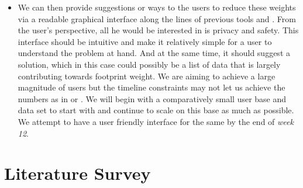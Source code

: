 \documentclass[11pt]{article}
\begin{document}
\begin{itemize}
   \item We can then provide suggestions or ways to the users to reduce these weights via a readable graphical interface along the lines of previous tools \cite{privaware} and \cite{privometer}. From the user’s perspective, all he would be interested in is privacy and safety. This interface should be intuitive and make it relatively simple for a user to understand the problem at hand. And at the same time, it should suggest a solution, which in this case could possibly be a list of data that is largely contributing towards footprint weight. We are aiming to achieve a large magnitude of users but the timeline constraints may not let us achieve the numbers as in \cite{emergingthreat} or \cite{privacypaper}. We will begin with a comparatively small user base and data set to start with and continue to scale on this base as much as possible. We attempt to have a user friendly interface for the same by the end of {\sl week 12}.
   \end{itemize}

\section{Literature Survey}
\paragraph{}
\end{document}
